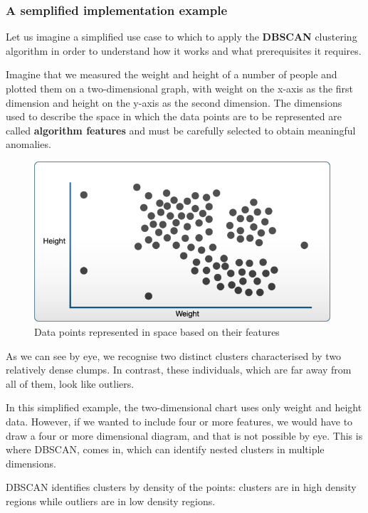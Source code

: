     
    \subsubsection{A semplified implementation example}
    \label{subsec:dbscan-example}
    
    Let us imagine a simplified use case to which to apply the \textbf{DBSCAN} clustering algorithm in order to understand how it works and what prerequisites it requires.
    
    Imagine that we measured the weight and height of a number of people and plotted them on a two-dimensional graph, with weight on the x-axis as the first dimension and height on the y-axis as the second dimension.
    The dimensions used to describe the space in which the data points are to be represented are called \textbf{algorithm features} and must be carefully selected to obtain meaningful anomalies.
    
    \begin{figure}[H]
        \centering
        \includegraphics[width=11cm]{Images/1/dbscan-ex-1.png}
        \caption{Data points represented in space based on their features}
    \end{figure}
    
    As we can see by eye, we recognise two distinct clusters characterised by two relatively dense clumps. In contrast, these individuals, which are far away from all of them, look like outliers.
    
    In this simplified example, the two-dimensional chart uses only weight and height data. However, if we wanted to include four or more features, we would have to draw a four or more dimensional diagram, and that is not possible by eye. This is where DBSCAN,  comes in, which can identify nested clusters in multiple dimensions.
    
    DBSCAN identifies clusters by density of the points: clusters are in high density regions while outliers are in low density regions.
    
